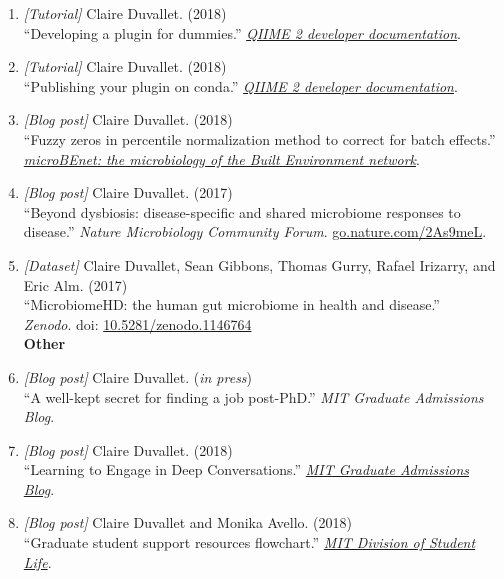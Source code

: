 \documentclass[10pt]{article}
\makeatletter
\newlength{\bibhang}
\newlength{\bibsep}
 {\@listi \global\bibsep\itemsep \global\advance\bibsep by\parsep}
\newenvironment{bibsection}%
        {\begin{enumerate}{}{%
       \setlength{\leftmargin}{\bibhang}%
       \setlength{\itemindent}{-\leftmargin}%
       \setlength{\itemsep}{\bibsep}%
       \setlength{\parsep}{\z@}%
        \setlength{\partopsep}{0pt}%
        \setlength{\topsep}{0pt}}}
        {\end{enumerate}\vspace{-.6\baselineskip}}
\makeatother
\begin{document}
\begin{bibsection}
	\item \textit{[Tutorial]} Claire Duvallet. (2018) \\ 
		``Developing a plugin for dummies.'' \href{https://dev.qiime2.org/latest/tutorials/first-plugin-tutorial/}{\emph{QIIME 2 developer documentation}}.	
	
	\item \textit{[Tutorial]} Claire Duvallet. (2018) \\ 
		``Publishing your plugin on conda.'' \href{https://dev.qiime2.org/latest/tutorials/conda-tutorial/}{\emph{QIIME 2 developer documentation}}.	

	\item \textit{[Blog post]} Claire Duvallet. (2018) \\ 
		``Fuzzy zeros in percentile normalization method to correct for batch effects.'' \href{https://microbe.net/2018/06/04/fuzzy-zeros-in-percentile-normalization-method-to-correct-for-batch-effects/}{\emph{microBEnet: the microbiology of the Built Environment network}}.	
		
	\item \textit{[Blog post]} Claire Duvallet. (2017) \\ 
		``Beyond dysbiosis: disease-specific and shared microbiome responses to disease.'' 
		\emph{Nature Microbiology Community Forum}. \href{http://go.nature.com/2As9meL}{go.nature.com/2As9meL}.
		
	\item \textit{[Dataset]} Claire Duvallet, Sean Gibbons, Thomas Gurry, Rafael Irizarry, and Eric Alm. (2017) \\ 
		``MicrobiomeHD: the human gut microbiome in health and disease.'' \\ 
		\emph{Zenodo}. doi: \href{https://zenodo.org/record/1146764}{10.5281/zenodo.1146764} \\

\textbf{Other}

	\item \textit{[Blog post]} Claire Duvallet. (\textit{in press}) \\ 
		``A well-kept secret for finding a job post-PhD.'' \emph{MIT Graduate Admissions Blog}.	
		
	\item \textit{[Blog post]} Claire Duvallet. (2018) \\ 
		``Learning to Engage in Deep Conversations.'' \href{https://gradadmissions.mit.edu/blog/learning-engage-deep-conversations}{\emph{MIT Graduate Admissions Blog}}.	
		
	\item \textit{[Blog post]} Claire Duvallet and Monika Avello. (2018) \\ 
		``Graduate student support resources flowchart.'' \href{https://dslx.mit.edu/resources/struggling-grad-school-find-ways-forward}{\emph{MIT Division of Student Life}}.			
\end{bibsection}
\end{document}

